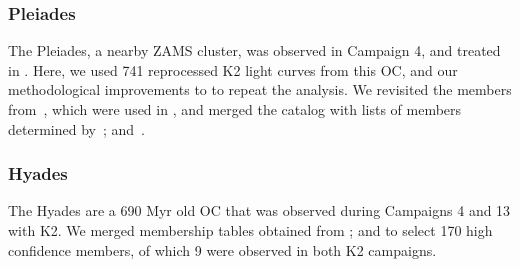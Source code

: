 \documentclass{aa}
\begin{document}
\subsubsection{Pleiades}
The Pleiades, a nearby ZAMS cluster, was observed in Campaign 4, and treated in . Here, we used 741 reprocessed K2 light curves from this OC, and our methodological improvements to  to repeat the analysis. We revisited the members from~\citet{rebull_pleiadesrot_2016}, which were used in , and merged the catalog with lists of members determined by~\citet{olivares_pleiades_2018, gaia_dr2_2018_hrd}; and~\citet{cantat_gaudin_2018}.
\subsubsection{Hyades}
The Hyades are a 690 Myr old OC that was observed during Campaigns 4 and 13 with K2.  We merged membership tables obtained from \citet{douglas_praesepe_hyades_2014, reino_hyades_2018}; and \citet{gaia_dr2_2018_hrd} to select 170 high confidence members, of which 9 were observed in both K2 campaigns. 
\end{document}
